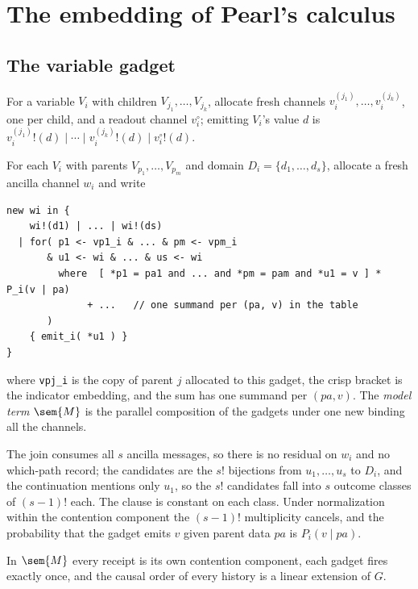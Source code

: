 \section{The embedding of Pearl's calculus}
\label{do:sec:pearl}

\subsection{The variable gadget}

For a variable $V_i$ with children $V_{j_1},\dots,V_{j_k}$, allocate fresh channels
$v_i^{(j_1)},\dots,v_i^{(j_k)}$, one per child, and a readout channel $v_i^{\circ}$; emitting
$V_i$'s value $d$ is $v_i^{(j_1)}!(d) \mid \cdots \mid v_i^{(j_k)}!(d) \mid v_i^{\circ}!(d)$.

\begin{definition}
\label{do:def:gadget}
For each $V_i$ with parents $V_{p_1},\dots,V_{p_m}$ and domain $D_i = \{d_1,\dots,d_s\}$,
allocate a fresh ancilla channel $w_i$ and write
\begin{lstlisting}
new wi in {
    wi!(d1) | ... | wi!(ds)
  | for( p1 <- vp1_i & ... & pm <- vpm_i
       & u1 <- wi & ... & us <- wi
         where  [ *p1 = pa1 and ... and *pm = pam and *u1 = v ] * P_i(v | pa)
              + ...   // one summand per (pa, v) in the table
       )
    { emit_i( *u1 ) }
}
\end{lstlisting}
where \texttt{vpj\_i} is the copy of parent $j$ allocated to this gadget, the crisp bracket is the
indicator embedding, and the sum has one summand per $(\mathit{pa}, v)$. The \emph{model term}
$\sem{M}$ is the parallel composition of the gadgets under one \textsf{new} binding all the
channels.
\end{definition}

The join consumes all $s$ ancilla messages, so there is no residual on $w_i$ and no which-path
record; the candidates are the $s!$ bijections from $u_1,\dots,u_s$ to $D_i$, and the continuation
mentions only $u_1$, so the $s!$ candidates fall into $s$ outcome classes of $(s-1)!$ each. The
clause is constant on each class. Under normalization within the contention component the
$(s-1)!$ multiplicity cancels, and the probability that the gadget emits $v$ given parent data
$\mathit{pa}$ is $P_i(v \mid \mathit{pa})$.

\begin{lemma}[Staging]
\label{do:lem:staging}
In $\sem{M}$ every receipt is its own contention component, each gadget fires exactly once, and the
causal order of every history is a linear extension of $G$.
\end{lemma}

